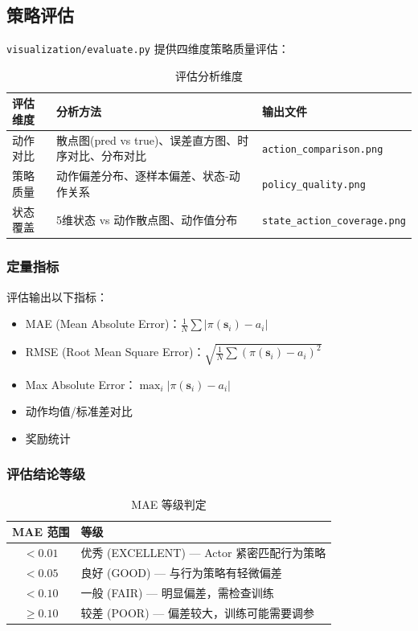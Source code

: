 \documentclass[11pt,a4paper]{ctexart}
\newcommand{\file}[1]{\texttt{#1}}
\begin{document}
\subsection{策略评估}

\file{visualization/evaluate.py} 提供四维度策略质量评估：

\begin{table}[H]
\centering
\caption{评估分析维度}
\begin{tabular}{lll}
\toprule
\textbf{评估维度} & \textbf{分析方法} & \textbf{输出文件} \\
\midrule
动作对比   & 散点图(pred vs true)、误差直方图、时序对比、分布对比 & \file{action\_comparison.png} \\
策略质量   & 动作偏差分布、逐样本偏差、状态-动作关系           & \file{policy\_quality.png} \\
状态覆盖   & 5维状态 vs 动作散点图、动作值分布                 & \file{state\_action\_coverage.png} \\
\bottomrule
\end{tabular}
\end{table}

\subsubsection{定量指标}

评估输出以下指标：
\begin{itemize}
    \item MAE (Mean Absolute Error)：$\frac{1}{N}\sum |\pi(\mathbf{s}_i) - a_i|$
    \item RMSE (Root Mean Square Error)：$\sqrt{\frac{1}{N}\sum (\pi(\mathbf{s}_i) - a_i)^2}$
    \item Max Absolute Error：$\max_i |\pi(\mathbf{s}_i) - a_i|$
    \item 动作均值/标准差对比
    \item 奖励统计
\end{itemize}

\subsubsection{评估结论等级}

\begin{table}[H]
\centering
\caption{MAE 等级判定}
\begin{tabular}{cl}
\toprule
\textbf{MAE 范围} & \textbf{等级} \\
\midrule
$< 0.01$ & 优秀 (EXCELLENT) — Actor 紧密匹配行为策略 \\
$< 0.05$ & 良好 (GOOD) — 与行为策略有轻微偏差 \\
$< 0.10$ & 一般 (FAIR) — 明显偏差，需检查训练 \\
$\geq 0.10$ & 较差 (POOR) — 偏差较大，训练可能需要调参 \\
\bottomrule
\end{tabular}
\end{table}
\end{document}

